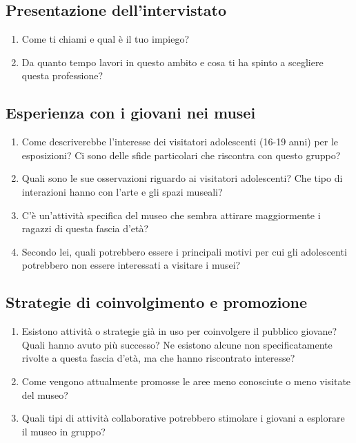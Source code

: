 \documentclass[a4paper, 12pt]{article}
\begin{document}
\subsection{\textcolor{subsectioncolor}{Presentazione dell'intervistato }}
\begin{enumerate}[label=\textcolor{textcolor}{\arabic*.}]
    \item \textcolor{textcolor}{Come ti chiami e qual è il tuo impiego?}
    \item \textcolor{textcolor}{Da quanto tempo lavori in questo ambito e cosa ti ha spinto a scegliere questa professione?}
\end{enumerate}

\subsection{\textcolor{subsectioncolor}{Esperienza con i giovani nei musei}}
\begin{enumerate}[label=\textcolor{textcolor}{\arabic*.}]
    \item \textcolor{textcolor}{Come descriverebbe l'interesse dei visitatori adolescenti (16-19 anni) per le esposizioni? Ci sono delle sfide particolari che riscontra con questo gruppo?}
    \item \textcolor{textcolor}{Quali sono le sue osservazioni riguardo ai visitatori adolescenti? Che tipo di interazioni hanno con l'arte e gli spazi museali?}
    \item \textcolor{textcolor}{C'è un'attività specifica del museo che sembra attirare maggiormente i ragazzi di questa fascia d'età?}
    \item Secondo lei, quali potrebbero essere i principali motivi per cui gli adolescenti potrebbero non essere interessati a visitare i musei?
\end{enumerate}


\subsection{\textcolor{subsectioncolor}{Strategie di coinvolgimento e promozione}}

\begin{enumerate}
    \item Esistono attività o strategie già in uso per coinvolgere il pubblico giovane? Quali hanno avuto più successo? Ne esistono alcune non specificatamente rivolte a questa fascia d’età, ma che hanno riscontrato interesse?
    \item Come vengono attualmente promosse le aree meno conosciute o meno visitate del museo?
    \item Quali tipi di attività collaborative potrebbero stimolare i giovani a esplorare il museo in gruppo?
\end{enumerate}
\end{document}
